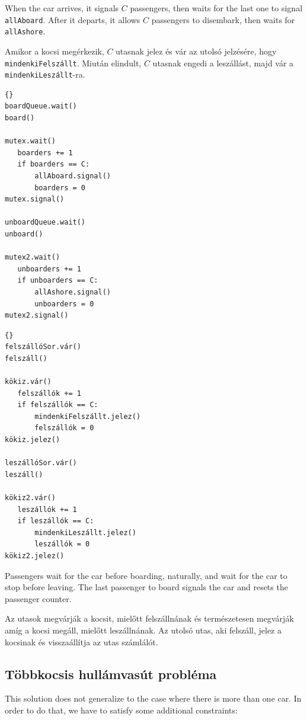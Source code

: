 \documentclass{book}
\newcommand{\clearemptydoublepage}{\newpage\cleardoublepage}
\begin{document}
When the car arrives, it signals $C$ passengers,
then waits for the last one to signal {\tt allAboard}.
After it departs, it allows $C$ passengers to disembark,
then waits for {\tt allAshore}.

Amikor a kocsi megérkezik, $C$ utasnak jelez és vár az utolsó jelzésére, hogy {\tt mindenkiFelszállt}.
Miután elindult, $C$ utasnak engedi a leszállást, majd vár
a {\tt mindenkiLeszállt}-ra.

\begin{lstlisting}[title={Roller Coaster solution (passenger)}]{}
boardQueue.wait()
board()

mutex.wait()
   boarders += 1
   if boarders == C:
       allAboard.signal()
       boarders = 0
mutex.signal()

unboardQueue.wait()
unboard()

mutex2.wait()
   unboarders += 1
   if unboarders == C:
       allAshore.signal()
       unboarders = 0
mutex2.signal()
\end{lstlisting}

\begin{lstlisting}[title={Hullámvasút megoldás (utasok)}]{}
felszállóSor.vár()
felszáll()

kökiz.vár()
   felszállók += 1
   if felszállók == C:
       mindenkiFelszállt.jelez()
       felszállók = 0
kökiz.jelez()

leszállóSor.vár()
leszáll()

kökiz2.vár()
   leszállók += 1
   if leszállók == C:
       mindenkiLeszállt.jelez()
       leszállók = 0
kökiz2.jelez()
\end{lstlisting}

Passengers wait for the car before boarding, naturally, and wait for
the car to stop before leaving.  The last passenger to board signals
the car and resets the passenger counter.

Az utasok megvárják a kocsit, mielőtt felszállnának és természetesen megvárják amíg a
kocsi megáll, mielőtt leszállnának. Az utolsó utas, aki felszáll, jelez a kocsinak és visszaállítja az utas
számlálót.

\clearemptydoublepage
\subsection{Többkocsis hullámvasút probléma}

This solution does not generalize to the case where there is more
than one car.  In order to do that, we have to satisfy some additional
constraints:
\end{document}
